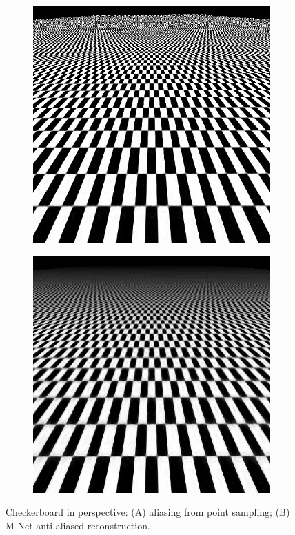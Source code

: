 \begin{figure}[!h]
  \centering
  \begin{subfigure}{0.46\linewidth}
    \centering
  \includegraphics[width=\linewidth]{img/ch5/im_0_alias.png}
  \caption{}
  \label{fig:alias-naive-checkerboard}
  \end{subfigure}
  \begin{subfigure}{0.46\linewidth}
    \centering
  \includegraphics[width=\linewidth]{img/ch5/im_0_anti_alias.png}
  \caption{}
  \label{fig:antialias-mnet-checkerboard}
  \end{subfigure}
  \caption{Checkerboard in perspective: (A) aliasing from point sampling; (B) M-Net anti-aliased reconstruction.}
  \label{f:alias-checkerboard}
\end{figure}



